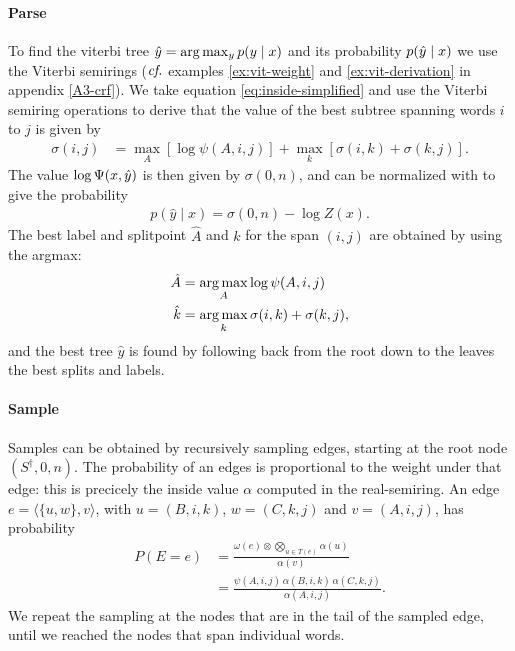   \paragraph{Parse}
    To find the viterbi tree $\hat{ y } = \arg \max_{ y } p(y  \mid x)$ and its probability $p(\hat{y} \mid x)$ we use the Viterbi semirings ($\emph{cf.}$ examples \ref{ex:vit-weight} and \ref{ex:vit-derivation} in appendix \ref{A3-crf}). We take equation \ref{eq:inside-simplified} and use the Viterbi semiring operations to derive that the value of the best subtree spanning words $i$ to $j$ is given by
    \begin{align}
      \label{eq:viterbi-score}
      \sigma(i,j)
        &= \max_{A} [ \log \psi(A, i, j) ] + \max_{k} [\sigma(i,k) + \sigma(k,j)].
    \end{align}
    The value $\log \Psi(x, \hat{y})$ is then given by $\sigma(0, n)$, and  can be normalized with to give the probability
    \begin{align}
      p(\hat{y} \mid x) = \sigma(0, n) - \log Z(x).
    \end{align}
    The best label and splitpoint $\hat{A}$ and $\hat{k}$ for the span $(i, j)$ are obtained by using the argmax:
    \begin{align}
      \label{eq:viterbi-tree}
      \hat{A} &= \operatorname*{arg\,max}_{ A  } \log \psi(A, i, j)  \\
      \hat{k} &= \operatorname*{arg\,max}_{ k } \sigma(i, k) + \sigma(k, j),
    \end{align}
    and the best tree $\hat{y}$ is found by following back from the root down to the leaves the best splits and labels.

  \paragraph{Sample}
    Samples can be obtained by recursively sampling edges, starting at the root node $(S^{\dagger}, 0, n)$. The probability of an edges is proportional to the weight under that edge: this is precicely the inside value $\alpha$ computed in the real-semiring. An edge $e = \langle \{ u, w \}, v \rangle$, with $u = (B, i, k)$, $w = (C, k, j)$ and $v = (A, i, j)$, has probability
    \begin{align}
      \label{eq:sample}
      P(E = e)
        &= \frac{\omega(e) \otimes \bigotimes_{u \in T(e)} \alpha(u)}{\alpha(v)}  \nonumber  \\
        &= \frac{\psi(A, i, j) \, \alpha(B, i, k) \, \alpha(C, k, j)}{\alpha(A, i, j)}.
    \end{align}
    We repeat the sampling at the nodes that are in the tail of the sampled edge, until we reached the nodes that span individual words.

